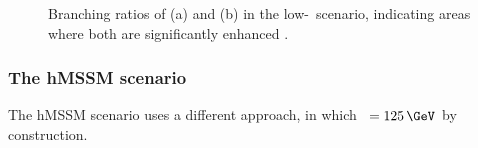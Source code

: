 \begin{figure}[h!]
\begin{center}
\end{center}
\caption[Branching ratios of \Htohh and \AtoZh in the low-\tanb~scenario.]{Branching ratios of (a) \Htohh and (b) \AtoZh in the low-\tanb~scenario, indicating 
areas where both are significantly enhanced \cite{MSSM-lowtanb}.}
\label{fig:lowtbhigh_br}
\end{figure}

\subsubsection{The hMSSM scenario}
\label{sec:theory_BSM_models_hMSSM}
The hMSSM scenario \cite{hMSSM-1,hMSSM-2} uses a different approach, in
which \mh~$=125\,\GeV$ by construction. 

